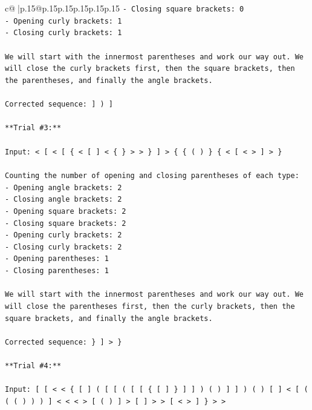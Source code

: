 \documentclass{article}
\begin{document}
{\begin{supertabular}{c@{$\;$}|p{.15\linewidth}@{}p{.15\linewidth}p{.15\linewidth}p{.15\linewidth}p{.15\linewidth}p{.15\linewidth}}
{{{\texttt{{-} Closing square brackets: 0} \\
\texttt{{-} Opening curly brackets: 1} \\
\texttt{{-} Closing curly brackets: 1} \\
\\ 
\texttt{We will start with the innermost parentheses and work our way out. We will close the curly brackets first, then the square brackets, then the parentheses, and finally the angle brackets.} \\
\\ 
\texttt{Corrected sequence: {]} ) {]}} \\
\\ 
\texttt{**Trial \#3:**} \\
\\ 
\texttt{Input: < {[} < {[} \{ < {[} {]} < \{ \} > > \} {]} > \{ \{ ( ) \} \{ < {[} < > {]} > \}} \\
\\ 
\texttt{Counting the number of opening and closing parentheses of each type:} \\
\texttt{{-} Opening angle brackets: 2} \\
\texttt{{-} Closing angle brackets: 2} \\
\texttt{{-} Opening square brackets: 2} \\
\texttt{{-} Closing square brackets: 2} \\
\texttt{{-} Opening curly brackets: 2} \\
\texttt{{-} Closing curly brackets: 2} \\
\texttt{{-} Opening parentheses: 1} \\
\texttt{{-} Closing parentheses: 1} \\
\\ 
\texttt{We will start with the innermost parentheses and work our way out. We will close the parentheses first, then the curly brackets, then the square brackets, and finally the angle brackets.} \\
\\ 
\texttt{Corrected sequence: \} {]} > \}} \\
\\ 
\texttt{**Trial \#4:**} \\
\\ 
\texttt{Input: {[} {[} < < \{ {[} {]} ( {[} {[} ( {[} {[} \{ {[} {]} \} {]} {]} ) ( ) {]} {]} ) ( ) {[} {]} < {[} ( ( ( ) ) ) {]} < < < > {[} ( ) {]} > {[} {]} > > {[} < > {]} \} > >} \\
\\ 
}}}
\end{supertabular}}
\end{document}
